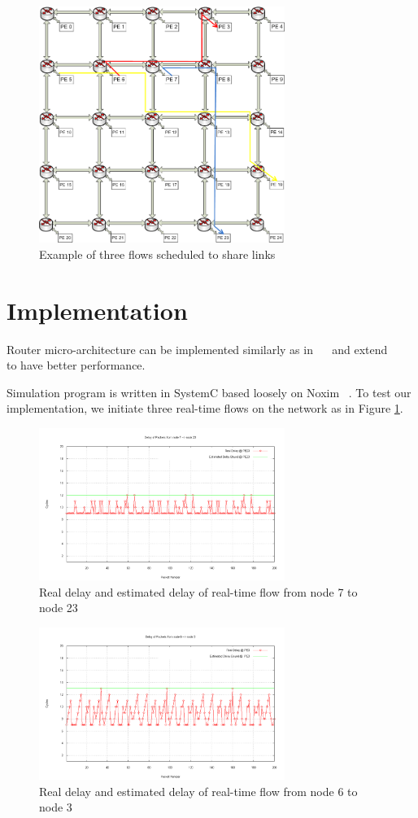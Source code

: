 \documentclass[conference, twocolumn]{IEEEtran}
\theoremstyle{definition}
\begin{document}
\begin{figure}[htp]
\centering
\includegraphics[width=8cm]{pics/Example.png}
\caption[Three flows example.]
{Example of three flows scheduled to share links}\label{fig:3FlowsEx}
\end{figure}

\section{Implementation}
Router micro-architecture can be implemented similarly as in
~\cite{Rexford98arouter}~\cite{ZhangService} and extend
~\cite{PehDelayModel}~\cite{PehSpecPipeR} to have better performance.

Simulation program is written in SystemC based loosely on Noxim ~\cite{Noxim}.
To test our implementation, we initiate three real-time flows on the network as
in Figure \ref{fig:3FlowsEx}.

\begin{figure}[htp]
\centering
\includegraphics[width=8cm]{pics/PE23.png}
\caption[Flow from node 7 to node 23.]
{Real delay and estimated delay of real-time flow from node
7 to node 23}\label{fig:PE7PE23}
\end{figure}

\begin{figure}[htp]
\centering
\includegraphics[width=8cm]{pics/PE3.png}
\caption[Three flows example.]
{Real delay and estimated delay of real-time flow from node
6 to node 3}\label{fig:PE6PE3}
\end{figure}
\end{document}
